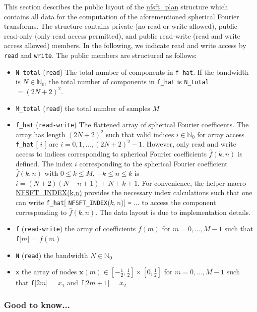 This section describes the public layout of the \hyperlink{structnfsft__plan}{nfsft\_\-plan} structure which contains all data for the computation of the aforementioned spherical Fourier transforms. The structure contains private (no read or write allowed), public read-only (only read access permitted), and public read-write (read and write access allowed) members. In the following, we indicate read and write access by {\tt read} and {\tt write}. The public members are structured as follows: \begin{itemize}
\item {\tt N\_\-total} ({\tt read}) The total number of components in {\tt f\_\-hat}. If the bandwidth is $N \in \mathbb{N}_0$, the total number of components in {\tt f\_\-hat} is {\tt N\_\-total} $ = (2N+2)^2$. \item {\tt M\_\-total} ({\tt read}) the total number of samples $M$ \item {\tt f\_\-hat} ({\tt read-write}) The flattened array of spherical Fourier coefficents. The array has length $(2N+2)^2$ such that valid indices $i \in \mathbb{N}_0$ for array access {\tt f\_\-hat} {\tt }\mbox{[} $i$ {\tt }\mbox{]} are $i=0,1,\ldots,(2N+2)^2-1$. However, only read and write access to indices corresponding to spherical Fourier coefficients $\hat{f}(k,n)$ is defined. The index $i$ corresponding to the spherical Fourier coefficient $\hat{f}(k,n)$ with $0 \le k \le M$, $-k \le n \le k$ is $i = (N+2)(N-n+1)+N+k+1$. For convenience, the helper macro \hyperlink{group__nfsft_ga40}{NFSFT\_\-INDEX(k,n)} provides the necessary index calculations such that one can write {\tt f\_\-hat}\mbox{[} {\tt NFSFT\_\-INDEX}($k,n${\tt })\mbox{]} {\tt =} {\tt }... to access the component corresponding to $\hat{f}(k,n)$. The data layout is due to implementation details. \item {\tt f} ({\tt read-write}) the array of coefficients $f(m)$ for $m=0,\ldots,M-1$ such that {\tt f}\mbox{[}$m${\tt }\mbox{]} = $f(m)$ \item {\tt N} ({\tt read}) the bandwidth $N \in \mathbb{N}_0$ \item {\tt x} the array of nodes $\mathbf{x}(m) \in [-\frac{1}{2},\frac{1}{2}] \times [0,\frac{1}{2}]$ for $m = 0, \ldots,M-1$ such that {\tt f}\mbox{[}$2m${\tt }\mbox{]} = $x_1$ and {\tt f}\mbox{[}$2m+1${\tt }\mbox{]} = $x_2$\end{itemize}
\hypertarget{group__nfsft_gtn}{}\subsubsection{Good to know...}\label{group__nfsft_gtn}
